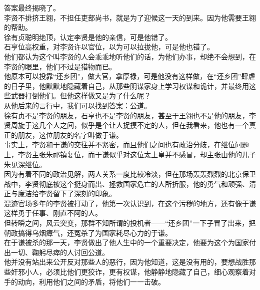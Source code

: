\begin{multicols}{\theparacolNo}
答案最终揭晓了。\\

李贤不排挤王翱，不担任吏部尚书，就是为了迎候这一天的到来。因为他需要王翱的帮助。\\

徐有贞聪明绝顶，认定李贤是他的亲信，可是他错了。\\

石亨位高权重，对李贤许以官位，以为可以拉拢他，可是他也错了。\\

他们都认为这个叫李贤的人会乖乖地听他们的话，为他们办事，却绝不会想到，在李贤的眼里，他们不过是猎物而已。\\

他原本可以投靠“还乡团”，做大官，拿厚禄，可是他没有这样做，在“还乡团”肆虐的日子里，他默默地隐藏着自己，从那些阴谋家身上学习权谋和诡计，并最终用这些武器打倒他们。但他这样做又是为了什么呢？\\

从他后来的言行中，我们可以找到答案：公道。\\

徐有贞不是李贤的朋友，石亨也不是李贤的朋友，甚至于王翱也不是他的朋友，李贤周旋于这几个人之间，似乎是个让人捉摸不定的人，但在我看来，他也有一个真正的朋友，这位朋友的名字叫做于谦。\\

事实上，李贤和于谦的交往并不紧密，而且他们之间也有政治分歧，在继位问题上，李贤主张朱祁镇复位，而于谦似乎对这位太上皇并不感冒，却主张由他的儿子朱见深继位。\\

因为有着不同的政治见解，两人关系一度比较冷淡，但在那场轰轰烈烈的北京保卫战中，李贤彻底被这个挺身而出、拯救国家危亡的人所折服，他的勇气和顽强、清正与廉洁给李贤留下了深刻的印象。\\

混迹官场多年的李贤被打动了，他第一次认识到，在这个污秽的地方，还有像于谦这样勇于任事、刚直不阿的人。\\

但转瞬之间，风云突变，那群不知所谓的投机者——“还乡团”一下子冒了出来，把朝政搞得乌烟瘴气，还冤杀了为国家耗尽心力的于谦。\\

在于谦被杀的那一天，李贤做出了他人生中的一个重要决定，他要为这个为国家付出一切、鞠躬尽瘁的人讨回公道。\\

他并没有站出来公开反对那些人的恶行，因为他知道，这是没有用的，要想战胜那些奸邪小人，必须比他们更狡诈，更有权谋，他静静地隐藏了自己，细心观察着对手的动向，利用他们之间的矛盾，将他们一一击破。\\


\end{multicols}
